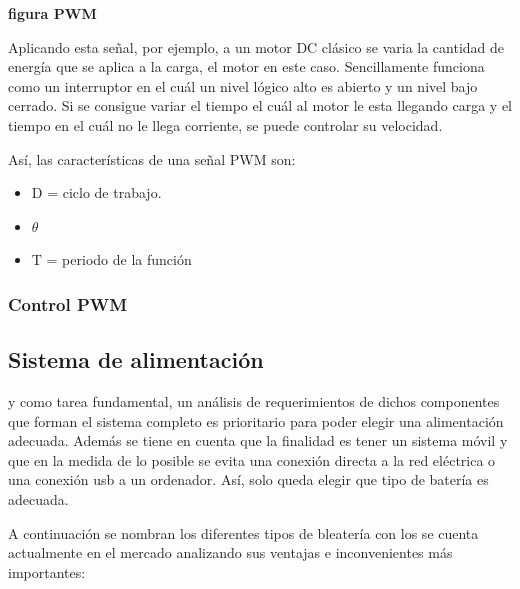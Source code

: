 \textbf{figura PWM}

Aplicando esta señal, por ejemplo, a un motor DC clásico se varia la cantidad de energía que se aplica a la carga, el motor en este caso. Sencillamente funciona como un interruptor en el cuál un nivel lógico alto es abierto y un nivel bajo cerrado. Si se consigue variar el tiempo el cuál al motor le esta llegando carga y el tiempo en el cuál no le llega corriente, se puede controlar su velocidad. \newline

Así, las características de una señal PWM son: 
\begin{itemize}
	\item D = ciclo de trabajo.
	\item $\theta$
	\item T = periodo de la función
\end{itemize}

\subsubsection{Control PWM}
\subsection{Sistema de alimentación}
y como tarea fundamental, un análisis de requerimientos de dichos componentes que forman el sistema completo es prioritario para poder elegir una alimentación adecuada. Además se tiene en cuenta que la finalidad es tener un sistema móvil y que en la medida de lo posible se evita una conexión directa a la red eléctrica o una conexión usb a un ordenador. Así, solo queda elegir que tipo de batería es adecuada. \newline

A continuación se nombran los diferentes tipos de bleatería con los se cuenta actualmente en el mercado analizando sus ventajas e inconvenientes más importantes: 

